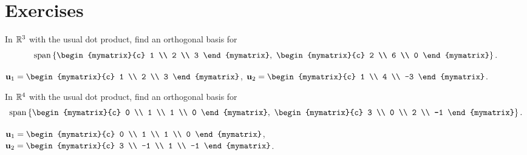 \section*{Exercises}

\begin{ex}\label{ex:orthogonal-basis-r3}
  In $\mathbb{R}^3$ with the usual dot product, find an orthogonal basis for
  \begin{equation*}
    \sspan\set{
      \begin{mymatrix}{c} 1 \\ 2 \\ 3 \end{mymatrix},~
      \begin{mymatrix}{c} 2 \\ 6 \\ 0 \end{mymatrix}
    }.
  \end{equation*}
  \begin{sol}
    $\vect{u}_1 = \begin{mymatrix}{c} 1 \\ 2 \\ 3 \end{mymatrix}$,
    $\vect{u}_2 = \begin{mymatrix}{c} 1 \\ 4 \\ -3 \end{mymatrix}$.
  \end{sol}
\end{ex}

\begin{ex}
  In $\mathbb{R}^4$ with the usual dot product, find an orthogonal basis for
  \begin{equation*}
    \sspan\set{
      \begin{mymatrix}{c} 0 \\ 1 \\ 1 \\  0 \end{mymatrix},~
      \begin{mymatrix}{c} 3 \\ 0 \\ 2 \\ -1 \end{mymatrix}
    }.
  \end{equation*}
  \begin{sol}
    $\vect{u}_1 = \begin{mymatrix}{c} 0 \\ 1 \\ 1 \\ 0 \end{mymatrix}$,
    $\vect{u}_2 = \begin{mymatrix}{c} 3 \\ -1 \\ 1 \\ -1 \end{mymatrix}$.
  \end{sol}
\end{ex}


